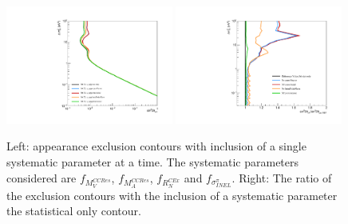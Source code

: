\begin{figure}[h!]
    \centering
    \includegraphics[width = 0.49\textwidth]{figures-chap6/exclusion_contours/single_param/nue_app_single_param.pdf}
    \includegraphics[width =0.49\textwidth]{figures-chap6/exclusion_contours/single_param/nue_app_single_param_ratio.pdf}
    \caption[\nue appearance exclusion contours with inclusion of a single systematic parameter at a time.]{Left: \nue appearance exclusion contours with inclusion of a single systematic parameter at a time. The systematic parameters considered are $f_{M_V^{CCRes}}$, $f_{M_A^{CCRes}}$, $f_{R_N^{C Ex}}$ and $f_{\sigma^{\pi}_{INEL}}$. Right: The ratio of the exclusion contours with the inclusion of a systematic parameter the statistical only contour.}
    \label{fig:nue_app_single_param}
\end{figure}

